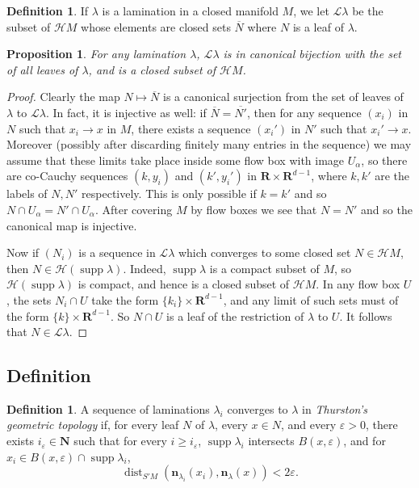 \documentclass[reqno,10pt]{amsart}
\newcommand{\NN}{\mathbf{N}}
\newcommand{\RR}{\mathbf{R}}
\DeclareMathOperator{\dist}{dist}
\DeclareMathOperator{\supp}{supp}
\newcommand{\Leaves}{\mathscr L}
\newcommand{\Hypspace}{\mathscr H}
\newcommand{\normal}{\mathbf n}
\newcommand{\dfn}[1]{\emph{#1}\index{#1}}
\newtheorem{proposition}[theorem]{Proposition}
\theoremstyle{definition}
\newtheorem{definition}[theorem]{Definition}
\numberwithin{equation}{section}
\begin{document}
\begin{definition}
If $\lambda$ is a lamination in a closed manifold $M$, we let $\Leaves \lambda$ be the subset of $\Hypspace M$ whose elements are closed sets $\overline N$ where $N$ is a leaf of $\lambda$.
\end{definition}

\begin{proposition}
For any lamination $\lambda$, $\Leaves \lambda$ is in canonical bijection with the set of all leaves of $\lambda$, and is a closed subset of $\Hypspace M$.
\end{proposition}
\begin{proof}
Clearly the map $N \mapsto \overline N$ is a canonical surjection from the set of leaves of $\lambda$ to $\Leaves \lambda$.
In fact, it is injective as well: if $\overline N = \overline{N'}$, then for any sequence $(x_i)$ in $N$ such that $x_i \to x$ in $M$, there exists a sequence $(x_i')$ in $N'$ such that $x_i' \to x$.
Moreover (possibly after discarding finitely many entries in the sequence) we may assume that these limits take place inside some flow box with image $U_\alpha$, so there are co-Cauchy sequences $(k, y_i)$ and $(k', y_i')$ in $\RR \times \RR^{d - 1}$, where $k, k'$ are the labels of $N, N'$ respectively.
This is only possible if $k = k'$ and so $N \cap U_\alpha = N' \cap U_\alpha$.
After covering $M$ by flow boxes we see that $N = N'$ and so the canonical map is injective.

Now if $(N_i)$ is a sequence in $\Leaves \lambda$ which converges to some closed set $N \in \Hypspace M$, then $N \in \Hypspace(\supp \lambda)$.
Indeed, $\supp \lambda$ is a compact subset of $M$, so $\Hypspace(\supp \lambda)$ is compact, and hence is a closed subset of $\Hypspace M$.
In any flow box $U$, the sets $N_i \cap U$ take the form $\{k_i\} \times \RR^{d - 1}$, and any limit of such sets must of the form $\{k\} \times \RR^{d - 1}$.
So $N \cap U$ is a leaf of the restriction of $\lambda$ to $U$.
It follows that $N \in \Leaves \lambda$.
\end{proof}

\subsection{Definition}

\begin{definition}
A sequence of laminations $\lambda_i$ converges to $\lambda$ in \dfn{Thurston's geometric topology} if, for every leaf $N$ of $\lambda$, every $x \in N$, and every $\varepsilon > 0$, there exists $i_\varepsilon \in \NN$ such that for every $i \geq i_\varepsilon$, $\supp \lambda_i$ intersects $B(x, \varepsilon)$, and for $x_i \in B(x, \varepsilon) \cap \supp \lambda_i$,
\begin{equation}\label{convergence of normals}
\dist_{S' M}(\normal_{\lambda_i}(x_i), \normal_\lambda(x)) < 2\varepsilon.
\end{equation}
\end{definition}
\end{document}
